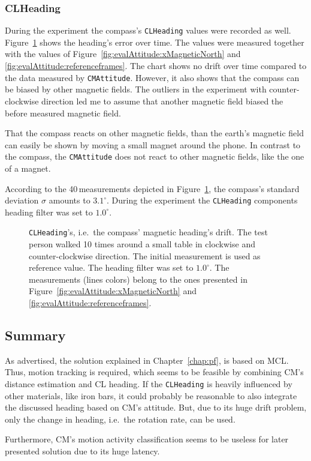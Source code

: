 \subsubsection*{CLHeading}
During the experiment the compass's \texttt{CLHeading} values were recorded as well. Figure~\ref{fig:eval:compass} shows the heading's error over time. The values were measured together with the values of Figure~\ref{fig:evalAttitude:xMagneticNorth} and \ref{fig:evalAttitude:referenceframes}. The chart shows no drift over time compared to the data measured by \texttt{CMAttitude}. However, it also shows that the compass can be biased by other magnetic fields. The outliers in the experiment with counter-clockwise direction led me to assume that another magnetic field biased the before measured magnetic field.

That the compass reacts on other magnetic fields, than the earth's magnetic field can easily be shown by moving a small magnet around the phone. In contrast to the compass, the \texttt{CMAttitude} does not react to other magnetic fields, like the one of a magnet.

According to the 40\,measurements depicted in Figure~\ref{fig:eval:compass}, the compass's standard deviation $\sigma$ amounts to $3.1^{\circ}$. During the experiment the \texttt{CLHeading} components heading filter was set to $1.0^{\circ}$.


\begin{figure}
	
	\caption{\texttt{CLHeading}'s, i.e.\ the compass' magnetic heading's drift. The test person walked 10 times around a small table in clockwise and counter-clockwise direction. The initial measurement is used as reference value. The heading filter was set to $1.0^{\circ}$. The measurements (lines colors) belong to the ones presented in Figure~\ref{fig:evalAttitude:xMagneticNorth} and \ref{fig:evalAttitude:referenceframes}.}
	\label{fig:eval:compass}
\end{figure}

\subsection{Summary}
As advertised, the solution explained in Chapter~\ref{chap:pf}, is based on \ac{MCL}. Thus, motion tracking is required, which seems to be feasible by combining \ac{CM}'s distance estimation and \ac{CL} heading. If the \texttt{CLHeading} is heavily influenced by other materials, like iron bars, it could probably be reasonable to also integrate the discussed heading based on \ac{CM}'s attitude. But, due to its huge drift problem, only the change in heading, i.e.\ the rotation rate, can be used.

Furthermore, \ac{CM}'s motion activity classification seems to be useless for later presented solution due to its huge latency.
